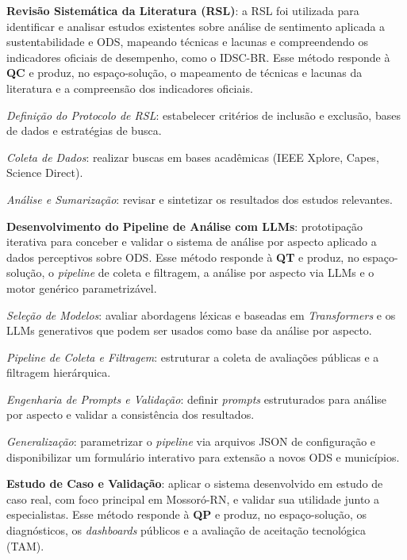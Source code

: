 {\begin{alineas}
    \item \textbf{Revisão Sistemática da Literatura (\gls{RSL})}: a RSL foi utilizada para identificar e analisar estudos existentes sobre análise de sentimento aplicada a sustentabilidade e ODS, mapeando técnicas e lacunas e compreendendo os indicadores oficiais de desempenho, como o IDSC-BR. Esse método responde à \textbf{QC} e produz, no espaço-solução, o mapeamento de técnicas e lacunas da literatura e a compreensão dos indicadores oficiais.
    \begin{alineas}
        \item \textit{Definição do Protocolo de RSL}: estabelecer critérios de inclusão e exclusão, bases de dados e estratégias de busca.
        \item \textit{Coleta de Dados}: realizar buscas em bases acadêmicas (IEEE Xplore, Capes, Science Direct).
        \item \textit{Análise e Sumarização}: revisar e sintetizar os resultados dos estudos relevantes.
    \end{alineas}
    \item \textbf{Desenvolvimento do Pipeline de Análise com LLMs}: prototipação iterativa para conceber e validar o sistema de análise por aspecto aplicado a dados perceptivos sobre ODS. Esse método responde à \textbf{QT} e produz, no espaço-solução, o \textit{pipeline} de coleta e filtragem, a análise por aspecto via \glspl{LLM} e o motor genérico parametrizável.
    \begin{alineas}
        \item \textit{Seleção de Modelos}: avaliar abordagens léxicas e baseadas em \textit{Transformers} e os \gls{LLM}s generativos que podem ser usados como base da análise por aspecto.
        \item \textit{Pipeline de Coleta e Filtragem}: estruturar a coleta de avaliações públicas e a filtragem hierárquica.
        \item \textit{Engenharia de \textit{Prompts} e Validação}: definir \textit{prompts} estruturados para análise por aspecto e validar a consistência dos resultados.
        \item \textit{Generalização}: parametrizar o \textit{pipeline} via arquivos JSON de configuração e disponibilizar um formulário interativo para extensão a novos ODS e municípios.
    \end{alineas}
    \item \textbf{Estudo de Caso e Validação}: aplicar o sistema desenvolvido em estudo de caso real, com foco principal em Mossoró-RN, e validar sua utilidade junto a especialistas. Esse método responde à \textbf{QP} e produz, no espaço-solução, os diagnósticos, os \textit{dashboards} públicos e a avaliação de aceitação tecnológica (TAM).

\end{alineas}}
